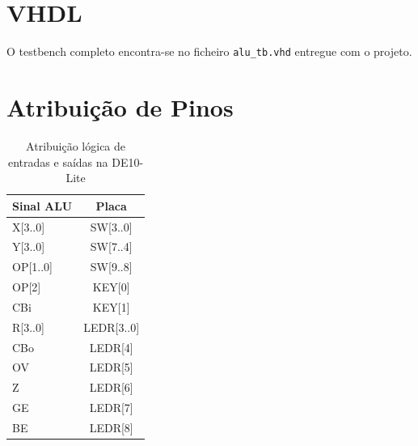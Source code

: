 \documentclass[12pt]{article}
\begin{document}
\section{VHDL}


O testbench completo encontra-se no ficheiro \texttt{alu\_tb.vhd} entregue
com o projeto.


\clearpage
\section{Atribuição de Pinos}

\renewcommand{\arraystretch}{1.5}
\begin{table}[h]\footnotesize
	\caption{Atribuição lógica de entradas e saídas na DE10-Lite}
  \centering
	\begin{tabular}{|l|c|}
	\hline
	\textbf{Sinal ALU} & \textbf{Placa} \\ \hline\hline
	X[3..0] & SW[3..0]  \\ 
	Y[3..0] & SW[7..4] \\
	OP[1..0] & SW[9..8] \\
	OP[2] & KEY[0] \\
	CBi & KEY[1] \\ \hline \hline
	R[3..0] & LEDR[3..0] \\
CBo & LEDR[4] \\
	OV & LEDR[5] \\
	Z & LEDR[6] \\
	GE & LEDR[7] \\
	BE & LEDR[8] \\
	\hline
	\end{tabular}
	
	\label{tab:pinos}
\end{table}
\end{document}
